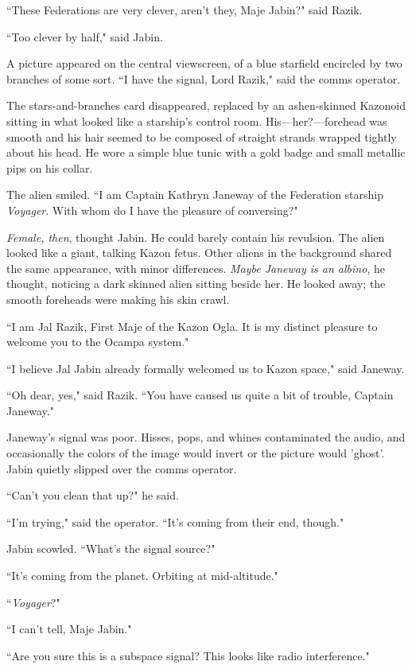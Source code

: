 \documentclass[twoside,letterpaper,12pt]{memoir}
\begin{document}
``These Federations are very clever, aren't they, Maje Jabin?" said Razik.

``Too clever by half," said Jabin.

A picture appeared on the central viewscreen, of a blue starfield encircled by two branches of some sort. ``I have the signal, Lord Razik," said the comms operator.

The stars-and-branches card disappeared, replaced by an ashen-skinned Kazonoid sitting in what looked like a starship's control room. His---her?---forehead was smooth and his hair seemed to be composed of straight strands wrapped tightly about his head. He wore a simple blue tunic with a gold badge and small metallic pips on his collar.

The alien smiled. ``I am Captain Kathryn Janeway of the Federation starship \textit{Voyager}. With whom do I have the pleasure of conversing?"

\textit{Female, then}, thought Jabin. He could barely contain his revulsion. The alien looked like a giant, talking Kazon fetus. Other aliens in the background shared the same appearance, with minor differences. \textit{Maybe Janeway is an albino}, he thought, noticing a dark skinned alien sitting beside her. He looked away; the smooth foreheads were making his skin crawl.

``I am Jal Razik, First Maje of the Kazon Ogla. It is my distinct pleasure to welcome you to the Ocampa system."

``I believe Jal Jabin already formally welcomed us to Kazon space," said Janeway.

``Oh dear, yes," said Razik. ``You have caused us quite a bit of trouble, Captain Janeway."

Janeway's signal was poor. Hisses, pops, and whines contaminated the audio, and occasionally the colors of the image would invert or the picture would 'ghost'. Jabin quietly slipped over the comms operator.

``Can't you clean that up?" he said.

``I'm trying," said the operator. ``It's coming from their end, though."

Jabin scowled. ``What's the signal source?"

``It's coming from the planet. Orbiting at mid-altitude."

``\textit{Voyager}?"

``I can't tell, Maje Jabin."

``Are you sure this is a subspace signal? This looks like radio interference."
\end{document}
